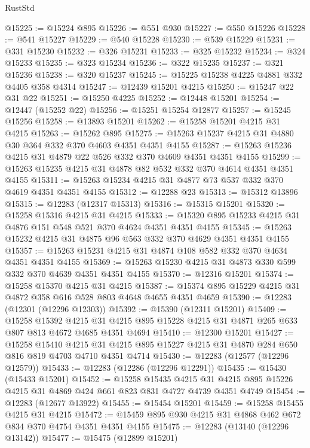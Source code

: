\begin{lexlean}{RustStd}
\begin{coremodule}
@15225 := @15224 @895
@15226 := @551 @930
@15227 := @550 @15226
@15228 := @541 @15227
@15229 := @540 @15228
@15230 := @539 @15229
@15231 := @331 @15230
@15232 := @326 @15231
@15233 := @325 @15232
@15234 := @324 @15233
@15235 := @323 @15234
@15236 := @322 @15235
@15237 := @321 @15236
@15238 := @320 @15237
@15245 := @15225 @15238 @4225 @4881 @332 @4405 @358 @4314
@15247 := @12439 @15201 @4215
@15250 := @15247 @22 @31 @22
@15251 := @15250 @4225
@15252 := @12448 @15201
@15254 := @12447 (@15252 @22)
@15256 := @15251 @15254 @12877
@15257 := @15245 @15256
@15258 := @13893 @15201
@15262 := @15258 @15201 @4215 @31 @4215
@15263 := @15262 @895
@15275 := @15263 @15237 @4215 @31 @4880 @30 @364 @332 @370 @4603 @4351 @4351 @4155
@15287 := @15263 @15236 @4215 @31 @4879 @22 @526 @332 @370 @4609 @4351 @4351 @4155
@15299 := @15263 @15235 @4215 @31 @4878 @82 @532 @332 @370 @4614 @4351 @4351 @4155
@15311 := @15263 @15234 @4215 @31 @4877 @73 @537 @332 @370 @4619 @4351 @4351 @4155
@15312 := @12288 @23
@15313 := @15312 @13896
@15315 := @12283 (@12317 @15313)
@15316 := @15315 @15201
@15320 := @15258 @15316 @4215 @31 @4215
@15333 := @15320 @895 @15233 @4215 @31 @4876 @151 @548 @521 @370 @4624 @4351 @4351 @4155
@15345 := @15263 @15232 @4215 @31 @4875 @96 @563 @332 @370 @4629 @4351 @4351 @4155
@15357 := @15263 @15231 @4215 @31 @4874 @108 @582 @332 @370 @4634 @4351 @4351 @4155
@15369 := @15263 @15230 @4215 @31 @4873 @330 @599 @332 @370 @4639 @4351 @4351 @4155
@15370 := @12316 @15201
@15374 := @15258 @15370 @4215 @31 @4215
@15387 := @15374 @895 @15229 @4215 @31 @4872 @358 @616 @528 @803 @4648 @4655 @4351 @4659
@15390 := @12283 (@12301 (@12296 @12303))
@15392 := @15390 (@12311 @15201)
@15409 := @15258
    @15392
    @4215
    @31
    @4215
    @895
    @15228
    @4215
    @31
    @4871
    @265
    @633
    @807
    @813
    @4672
    @4685
    @4351
    @4694
@15410 := @12300 @15201
@15427 := @15258
    @15410
    @4215
    @31
    @4215
    @895
    @15227
    @4215
    @31
    @4870
    @284
    @650
    @816
    @819
    @4703
    @4710
    @4351
    @4714
@15430 := @12283 (@12577 (@12296 @12579))
@15433 := @12283 (@12286 (@12296 @12291))
@15435 := @15430 (@15433 @15201)
@15452 := @15258
    @15435
    @4215
    @31
    @4215
    @895
    @15226
    @4215
    @31
    @4869
    @424
    @661
    @823
    @831
    @4727
    @4739
    @4351
    @4749
@15454 := @12283 (@12677 @13922)
@15455 := @15454 @15201
@15459 := @15258 @15455 @4215 @31 @4215
@15472 := @15459 @895 @930 @4215 @31 @4868 @462 @672 @834 @370 @4754 @4351 @4351 @4155
@15475 := @12283 (@13140 (@12296 @13142))
@15477 := @15475 (@12899 @15201)

\end{coremodule}
\end{lexlean}
